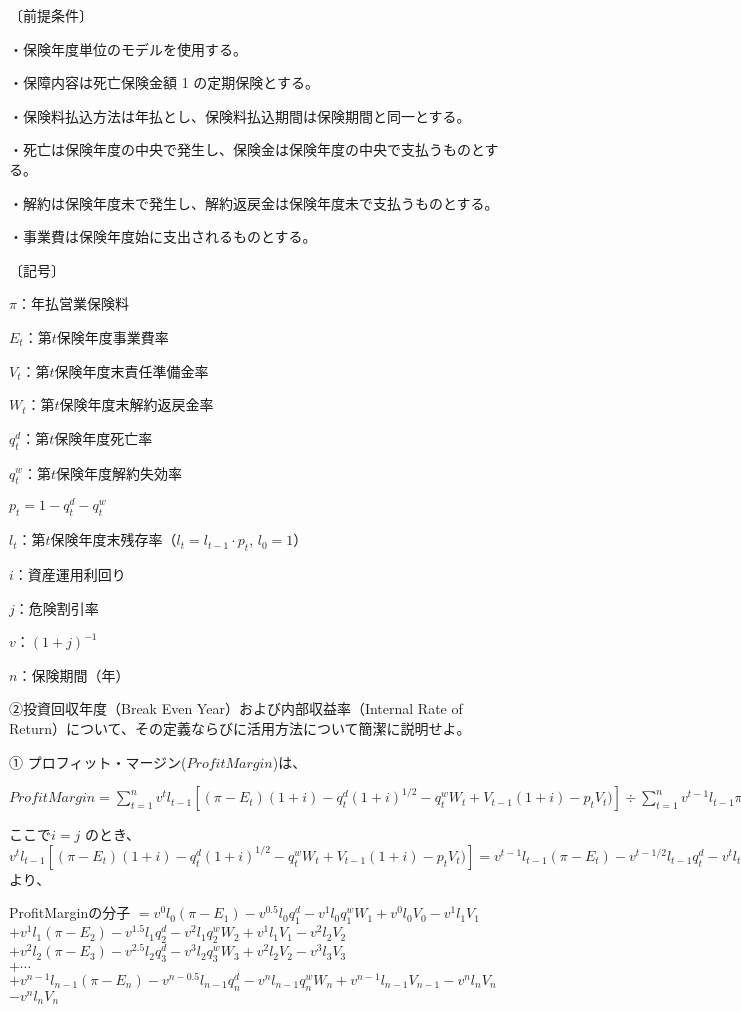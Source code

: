 \documentclass[report,gutter=10mm,fore-edge=10mm,uplatex,dvipdfmx]{jlreq}
\begin{document}
〔前提条件〕

・保険年度単位のモデルを使用する。

・保障内容は死亡保険金額 1 の定期保険とする。

・保険料払込方法は年払とし、保険料払込期間は保険期間と同一とする。

・死亡は保険年度の中央で発生し、保険金は保険年度の中央で支払うものとする。

・解約は保険年度未で発生し、解約返戻金は保険年度未で支払うものとする。

・事業費は保険年度始に支出されるものとする。

〔記号〕

$\pi$：年払営業保険料

$E_t$：第$t$保険年度事業費率

$V_t$：第$t$保険年度末責任準備金率

$W_t$：第$t$保険年度末解約返戻金率

$q_t^d$：第$t$保険年度死亡率

$q_t^w$：第$t$保険年度解約失効率

$p_t = 1  - q_t^d - q_t^w$

$l_t$：第$t$保険年度末残存率（$l_t=l_{t-1}\cdot p_t$, $l_0=1$）

$i$：資産運用利回り

$j$：危険割引率

$v$：$(1+j)^{-1}$

$n$：保険期間（年）

②投資回収年度（Break Even Year）および内部収益率（Internal Rate of Return）について、その定義ならびに活用方法について簡潔に説明せよ。
\answer{}

①
プロフィット・マージン($ProfitMargin$)は、

$ProfitMargin = \sum^n_{t=1} v^t l_{t-1}[(\pi-E_t)(1+i)-q_t^d(1+i)^{1/2}-q_t^wW_t+V_{t-1}(1+i)-p_tV_t)]\div \sum^n_{t=1}v^{t-1}l_{t-1}\pi$

ここで$i=j$ のとき、
$v^t l_{t-1}[(\pi-E_t)(1+i)-q_t^d(1+i)^{1/2}-q_t^wW_t+V_{t-1}(1+i)-p_tV_t)]
= v^{t-1}l_{t-1}(\pi-E_t) - v^{t-1/2}l_{t-1}q_t^d - v^tl_{t-1}q_t^w W_t + v^{t-1}l_{t-1}V_{t-1} - v^tl_tV_t$
より、

ProfitMarginの分子
$=v^0l_0(\pi-E_1)-v^{0.5}l_0q_1^d - v^1l_0q_1^wW_1 + v^0l_0V_0 - v^1l_1V_1$\\
$+v^1l_1(\pi-E_2)-v^{1.5}l_1q_2^d - v^2l_1q_2^wW_2 + v^1l_1V_1 - v^2l_2V_2$\\
$+v^2l_2(\pi-E_3)-v^{2.5}l_2q_3^d - v^3l_2q_3^wW_3 + v^2l_2V_2 - v^3l_3V_3$\\
$+\cdots$\\
$+v^{n-1}l_{n-1}(\pi-E_{n})-v^{n-0.5}l_{n-1}q_{n}^d - v^{n}l_{n-1}q_{n}^wW_{n} + v^{n-1}l_{n-1}V_{n-1} - v^{n}l_{n}V_{n}$
$-v^nl_nV_n$
\end{document}
